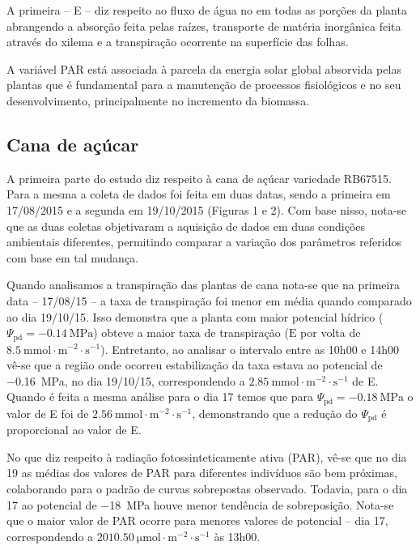 \documentclass[a4paper, 12pt]{article}
\numberwithin{equation}{section}
\begin{document}
	A primeira -- E -- diz respeito ao fluxo de água no em todas as porções da planta abrangendo a absorção feita pelas raízes, transporte de matéria inorgânica feita através do xilema e a transpiração ocorrente na superfície das folhas. 
	
	A variável PAR está associada à parcela da energia solar global absorvida pelas plantas que é fundamental para a manutenção de processos fisiológicos e no seu desenvolvimento, principalmente no incremento da biomassa.
	

	\subsection{Cana de açúcar}	
	A primeira parte do estudo diz respeito à cana de açúcar variedade RB67515. Para a mesma a coleta de dados foi feita em duas datas, sendo a primeira em 17/08/2015 e a segunda em 19/10/2015 (Figuras 1 e 2). Com base nisso, nota-se que as duas coletas objetivaram a aquisição de dados em duas condições ambientais diferentes, permitindo comparar a variação dos parâmetros referidos com base em tal mudança.
	
	Quando analisamos a transpiração das plantas de cana nota-se que na primeira data -- 17/08/15 -- a taxa de transpiração foi menor em média quando comparado ao dia 19/10/15. Isso demonstra que a planta com maior potencial hídrico ($\Psi_{\textrm{pd}}=\SI{-0.14}{\mega\pascal}$) obteve a maior taxa de transpiração ($\textrm{E}$ por volta de $\SI{8.5}{\milli\mole\cdot\meter^{-2}\cdot\second^{-1}}$). Entretanto, ao analisar o intervalo entre as 10h00 e 14h00 vê-se que a região onde ocorreu estabilização da taxa estava ao potencial de \SI{-.16}{\mega\pascal}, no dia 19/10/15, correspondendo a $\SI{2.85}{\milli\mole\cdot\meter^{-2}\cdot\second^{-1}}$ de E. Quando é feita a mesma análise para o dia 17 temos que para $\Psi_{\textrm{pd}}=\SI{-0.18}{\mega\pascal}$ o valor de E foi de $\SI{2.56}{\milli\mole\cdot\meter^{-2}\cdot\second^{-1}}$, demonstrando que a redução do $\Psi_{\textrm{pd}}$ é proporcional ao valor de E. 
	
	No que diz respeito à radiação fotossinteticamente ativa (PAR), vê-se que no dia 19 as médias dos valores de PAR para diferentes indivíduos são bem próximas, colaborando para o padrão de curvas sobrepostas observado. Todavia, para o dia 17 ao potencial de \SI{-18}{\mega\pascal} houve menor tendência de sobreposição. Nota-se que o maior valor de PAR ocorre para menores valores de potencial -- dia 17, correspondendo a $\SI{2010.50}{\micro\mole\cdot\meter^{-2}\cdot\second^{-1}}$ às 13h00.
	
\end{document}

